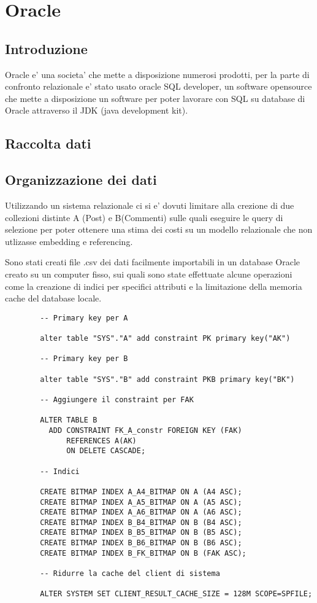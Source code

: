 \chapter{Oracle}

\section{Introduzione}

Oracle e' una societa' che mette a disposizione numerosi prodotti, per la parte di confronto relazionale e' stato usato oracle SQL developer, un software opensource che 
mette a disposizione un software per poter lavorare con SQL su database di Oracle attraverso il JDK (java development kit).

\section{Raccolta dati}

\section{Organizzazione dei dati}

Utilizzando un sistema relazionale ci si e' dovuti limitare alla crezione di due collezioni distinte A (Post) e B(Commenti) sulle quali eseguire le query di selezione per poter
ottenere una stima dei costi su un modello relazionale che non utlizasse embedding e referencing.

Sono stati creati file .csv dei dati facilmente importabili in un database Oracle creato su un computer fisso, sui quali sono state effettuate alcune operazioni come la creazione di 
indici per specifici attributi e la limitazione della memoria cache del database locale. 

\begin{verbatim}
        -- Primary key per A

        alter table "SYS"."A" add constraint PK primary key("AK") 

        -- Primary key per B

        alter table "SYS"."B" add constraint PKB primary key("BK") 

        -- Aggiungere il constraint per FAK

        ALTER TABLE B
          ADD CONSTRAINT FK_A_constr FOREIGN KEY (FAK)     
              REFERENCES A(AK)
              ON DELETE CASCADE;

        -- Indici

        CREATE BITMAP INDEX A_A4_BITMAP ON A (A4 ASC);
        CREATE BITMAP INDEX A_A5_BITMAP ON A (A5 ASC);
        CREATE BITMAP INDEX A_A6_BITMAP ON A (A6 ASC);
        CREATE BITMAP INDEX B_B4_BITMAP ON B (B4 ASC);
        CREATE BITMAP INDEX B_B5_BITMAP ON B (B5 ASC);
        CREATE BITMAP INDEX B_B6_BITMAP ON B (B6 ASC);
        CREATE BITMAP INDEX B_FK_BITMAP ON B (FAK ASC);

        -- Ridurre la cache del client di sistema

        ALTER SYSTEM SET CLIENT_RESULT_CACHE_SIZE = 128M SCOPE=SPFILE;
 
\end{verbatim}

